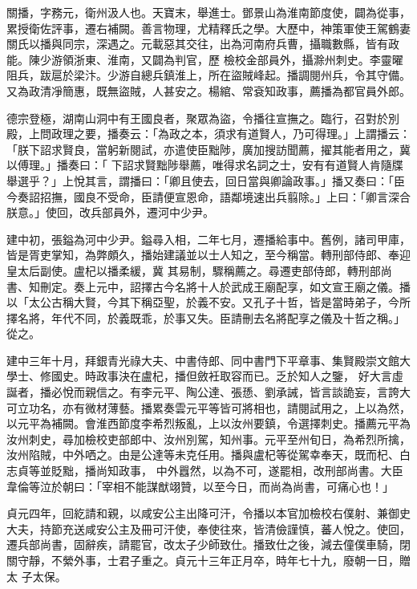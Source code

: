 \begin{pinyinscope}
 關播，字務元，衛州汲人也。天寶末，舉進士。鄧景山為淮南節度使，闢為從事，累授衛佐評事，遷右補闕。善言物理，尤精釋氏之學。大歷中，神策軍使王駕鶴妻關氏以播與同宗，深遇之。元載惡其交往，出為河南府兵曹，攝職數縣，皆有政能。陳少游領浙東、淮南，又闢為判官，歷
 檢校金部員外，攝滁州刺史。李靈曜阻兵，跋扈於梁汴。少游自總兵鎮淮上，所在盜賊峰起。播調閱州兵，令其守備。又為政清凈簡惠，既無盜賊，人甚安之。楊綰、常袞知政事，薦播為都官員外郎。



 德宗登極，湖南山洞中有王國良者，聚眾為盜，令播往宣撫之。臨行，召對於別殿，上問政理之要，播奏云：「為政之本，須求有道賢人，乃可得理。」上謂播云：「朕下詔求賢良，當躬新閱試，亦遣使臣黜陟，廣加搜訪聞薦，擢其能者用之，冀以傅理。」播奏曰：「
 下詔求賢黜陟舉薦，唯得求名詞之士，安有有道賢人肯隨牒舉選乎？」上悅其言，謂播曰：「卿且使去，回日當與卿論政事。」播又奏曰：「臣今奏詔招撫，國良不受命，臣請便宣恩命，語鄰境速出兵翦除。」上曰：「卿言深合朕意。」使回，改兵部員外，遷河中少尹。



 建中初，張鎰為河中少尹。鎰尋入相，二年七月，遷播給事中。舊例，諸司甲庫，皆是胥吏掌知，為弊頗久，播始建議並以士人知之，至今稱當。轉刑部侍郎、奉迎皇太后副使。盧杞以播柔緩，冀
 其易制，驟稱薦之。尋遷吏部侍郎，轉刑部尚書、知刪定。奏上元中，詔擇古今名將十人於武成王廟配享，如文宣王廟之儀。播以「太公古稱大賢，今其下稱亞聖，於義不安。又孔子十哲，皆是當時弟子，今所擇名將，年代不同，於義既乖，於事又失。臣請刪去名將配享之儀及十哲之稱。」從之。



 建中三年十月，拜銀青光祿大夫、中書侍郎、同中書門下平章事、集賢殿崇文館大學士、修國史。時政事決在盧杞，播但斂衽取容而已。乏於知人之鑒，
 好大言虛誕者，播必悅而親信之。有李元平、陶公達、張愻、劉承誡，皆言談詭妄，言誇大可立功名，亦有微材薄藝。播累奏雲元平等皆可將相也，請閱試用之，上以為然，以元平為補闕。會淮西節度李希烈叛亂，上以汝州要鎮，令選擇刺史。播薦元平為汝州刺史，尋加檢校吏部郎中、汝州別駕，知州事。元平至州旬日，為希烈所擒，汝州陷賊，中外哂之。由是公達等未克任用。播與盧杞等從駕幸奉天，既而杞、白志貞等並貶黜，播尚知政事，
 中外囂然，以為不可，遂罷相，改刑部尚書。大臣韋倫等泣於朝曰：「宰相不能謀猷翊贊，以至今日，而尚為尚書，可痛心也！」



 貞元四年，回紇請和親，以咸安公主出降可汗，令播以本官加檢校右僕射、兼御史大夫，持節充送咸安公主及冊可汗使，奉使往來，皆清儉謹慎，蕃人悅之。使回，遷兵部尚書，固辭疾，請罷官，改太子少師致仕。播致仕之後，減去僮僕車騎，閉關守靜，不縈外事，士君子重之。貞元十三年正月卒，時年七十九，廢朝一日，贈太
 子太保。




\end{pinyinscope}
